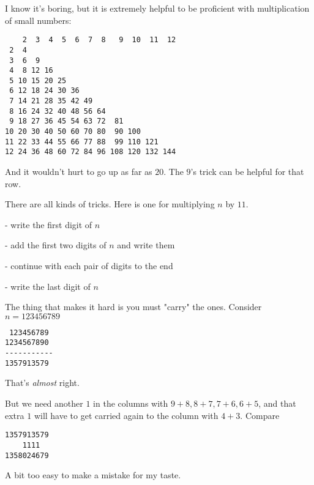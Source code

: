 \documentclass[11pt, oneside]{article}
\begin{document}
I know it's boring, but it is extremely helpful to be proficient with multiplication of small numbers:

\begin{verbatim}
    2  3  4  5  6  7  8   9  10  11  12
 2  4
 3  6  9
 4  8 12 16
 5 10 15 20 25
 6 12 18 24 30 36
 7 14 21 28 35 42 49
 8 16 24 32 40 48 56 64
 9 18 27 36 45 54 63 72  81
10 20 30 40 50 60 70 80  90 100
11 22 33 44 55 66 77 88  99 110 121
12 24 36 48 60 72 84 96 108 120 132 144
\end{verbatim}

And it wouldn't hurt to go up as far as $20$.  The $9$'s trick can be helpful for that row.

There are all kinds of tricks.  Here is one for multiplying $n$ by $11$.  

- write the first digit of $n$

- add the first two digits of $n$ and write them

- continue with each pair of digits to the end

- write the last digit of $n$

The thing that makes it hard is you must "carry" the ones.  Consider $n=123456789$

\begin{verbatim}
 123456789
1234567890
-----------
1357913579
\end{verbatim}

That's \emph{almost} right.

But we need another $1$ in the columns with $9+8, 8+7, 7+6, 6+5$, and that extra $1$ will have to get carried again to the column with $4+3$.  Compare

\begin{verbatim}
1357913579
    1111
1358024679
\end{verbatim}

A bit too easy to make a mistake for my taste.
\end{document}
